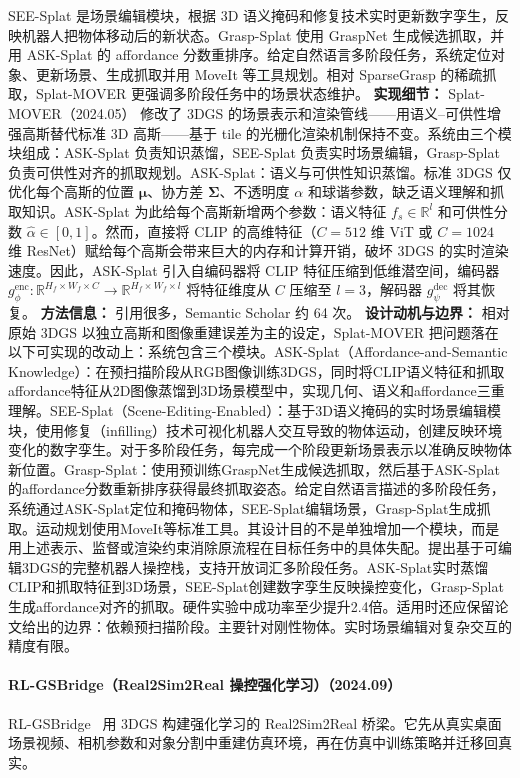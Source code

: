 SEE-Splat 是场景编辑模块，根据 3D 语义掩码和修复技术实时更新数字孪生，反映机器人把物体移动后的新状态。Grasp-Splat 使用 GraspNet 生成候选抓取，并用 ASK-Splat 的 affordance 分数重排序。给定自然语言多阶段任务，系统定位对象、更新场景、生成抓取并用 MoveIt 等工具规划。相对 SparseGrasp 的稀疏抓取，Splat-MOVER 更强调多阶段任务中的场景状态维护。
\textbf{实现细节：} Splat-MOVER（2024.05） 修改了 3DGS 的场景表示和渲染管线——用语义--可供性增强高斯替代标准 3D 高斯——基于 tile 的光栅化渲染机制保持不变。系统由三个模块组成：ASK-Splat 负责知识蒸馏，SEE-Splat 负责实时场景编辑，Grasp-Splat 负责可供性对齐的抓取规划。ASK-Splat：语义与可供性知识蒸馏。标准 3DGS 仅优化每个高斯的位置 $\boldsymbol{\mu}$、协方差 $\boldsymbol{\Sigma}$、不透明度 $\alpha$ 和球谐参数，缺乏语义理解和抓取知识。ASK-Splat 为此给每个高斯新增两个参数：语义特征 $f_s \in \mathbb{R}^l$ 和可供性分数 $\hat{\alpha} \in [0,1]$。然而，直接将 CLIP 的高维特征（$C=512$ 维 ViT 或 $C=1024$ 维 ResNet）赋给每个高斯会带来巨大的内存和计算开销，破坏 3DGS 的实时渲染速度。因此，ASK-Splat 引入自编码器将 CLIP 特征压缩到低维潜空间，编码器 $g_\phi^{\mathrm{enc}}: \mathbb{R}^{H_f \times W_f \times C} \to \mathbb{R}^{H_f \times W_f \times l}$ 将特征维度从 $C$ 压缩至 $l = 3$，解码器 $g_\psi^{\mathrm{dec}}$ 将其恢复。
\textbf{方法信息：} 引用很多，Semantic Scholar 约 64 次。
\textbf{设计动机与边界：} 相对原始 3DGS 以独立高斯和图像重建误差为主的设定，Splat-MOVER 把问题落在以下可实现的改动上：系统包含三个模块。ASK-Splat（Affordance-and-Semantic Knowledge）：在预扫描阶段从RGB图像训练3DGS，同时将CLIP语义特征和抓取affordance特征从2D图像蒸馏到3D场景模型中，实现几何、语义和affordance三重理解。SEE-Splat（Scene-Editing-Enabled）：基于3D语义掩码的实时场景编辑模块，使用修复（infilling）技术可视化机器人交互导致的物体运动，创建反映环境变化的数字孪生。对于多阶段任务，每完成一个阶段更新场景表示以准确反映物体新位置。Grasp-Splat：使用预训练GraspNet生成候选抓取，然后基于ASK-Splat的affordance分数重新排序获得最终抓取姿态。给定自然语言描述的多阶段任务，系统通过ASK-Splat定位和掩码物体，SEE-Splat编辑场景，Grasp-Splat生成抓取。运动规划使用MoveIt等标准工具。其设计目的不是单独增加一个模块，而是用上述表示、监督或渲染约束消除原流程在目标任务中的具体失配。提出基于可编辑3DGS的完整机器人操控栈，支持开放词汇多阶段任务。ASK-Splat实时蒸馏CLIP和抓取特征到3D场景，SEE-Splat创建数字孪生反映操控变化，Grasp-Splat生成affordance对齐的抓取。硬件实验中成功率至少提升2.4倍。适用时还应保留论文给出的边界：依赖预扫描阶段。主要针对刚性物体。实时场景编辑对复杂交互的精度有限。
\paragraph{RL-GSBridge（Real2Sim2Real 操控强化学习）（2024.09）}
RL-GSBridge~\cite{2409_20291} 用 3DGS 构建强化学习的 Real2Sim2Real 桥梁。它先从真实桌面场景视频、相机参数和对象分割中重建仿真环境，再在仿真中训练策略并迁移回真实。

